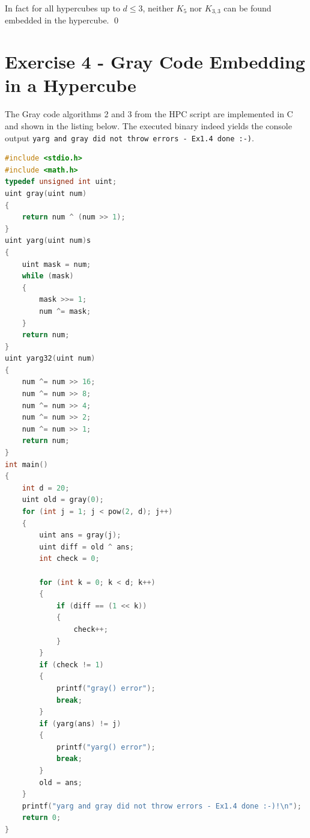 In fact for all hypercubes up to $d \le 3$, neither $K_5$ nor $K_{3,3}$ can be found embedded in the hypercube. \linebreak \qed

\pagebreak

\section{Exercise 4 - Gray Code Embedding in a Hypercube}
The Gray code algorithms 2 and 3 from the HPC script are implemented in C and shown in the listing below. The executed binary indeed yields
the console output \texttt{yarg and gray did not throw errors - Ex1.4 done :-)}.

\begin{lstlisting}[language=C, title=C Language Listing for EX1.4 ]
#include <stdio.h>
#include <math.h>
typedef unsigned int uint;
uint gray(uint num)
{
    return num ^ (num >> 1); 
}
uint yarg(uint num)s
{
    uint mask = num;
    while (mask)
    { 
        mask >>= 1;
        num ^= mask;
    }
    return num;
}
uint yarg32(uint num)
{
    num ^= num >> 16;
    num ^= num >> 8;
    num ^= num >> 4;
    num ^= num >> 2;
    num ^= num >> 1;
    return num;
}
int main()
{
    int d = 20;
    uint old = gray(0);
    for (int j = 1; j < pow(2, d); j++)
    {
        uint ans = gray(j);
        uint diff = old ^ ans;
        int check = 0;

        for (int k = 0; k < d; k++)
        {
            if (diff == (1 << k))
            {
                check++;
            }
        }
        if (check != 1)
        {
            printf("gray() error");
            break;
        }
        if (yarg(ans) != j)
        {
            printf("yarg() error");
            break;
        }
        old = ans;
    }
    printf("yarg and gray did not throw errors - Ex1.4 done :-)!\n");
    return 0;
}
\end{lstlisting}